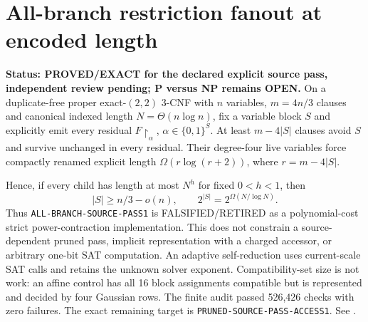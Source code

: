 \section{All-branch restriction fanout at encoded length}
\textbf{Status: PROVED/EXACT for the declared explicit source pass, independent review pending; P versus NP remains OPEN.}
On a duplicate-free proper exact-$(2,2)$ 3-CNF with $n$ variables,
$m=4n/3$ clauses and canonical indexed length $N=\Theta(n\log n)$,
fix a variable block $S$ and explicitly emit every residual
$F\!\upharpoonright_\alpha$, $\alpha\in\{0,1\}^S$.  At least
$m-4|S|$ clauses avoid $S$ and survive unchanged in every residual.  Their
degree-four live variables force compactly renamed explicit length
$\Omega(r\log(r+2))$, where $r=m-4|S|$.

Hence, if every child has length at most $N^h$ for fixed $0<h<1$, then
\[
 |S|\ge n/3-o(n),\qquad
 2^{|S|}=2^{\Omega(N/\log N)}.
\]
Thus \texttt{ALL-BRANCH-SOURCE-PASS1} is FALSIFIED/RETIRED as a
polynomial-cost strict power-contraction implementation.  This does not
constrain a source-dependent pruned pass, implicit representation with a
charged accessor, or arbitrary one-bit SAT computation.  An adaptive
self-reduction uses current-scale SAT calls and retains the unknown solver
exponent.  Compatibility-set size is not work: an affine control has all 16
block assignments compatible but is represented and decided by four
Gaussian rows.  The finite audit passed 526,426 checks with zero failures.
The exact remaining target is \texttt{PRUNED-SOURCE-PASS-ACCESS1}.
See
.

